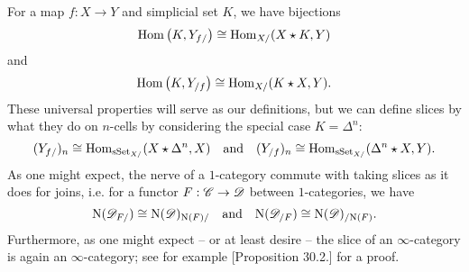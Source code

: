 \documentclass[../../thesis.tex]{subfiles}
\begin{document}
For a map $f:X\to Y$ and simplicial set $K$, we have bijections
\[
    \mathrm{Hom}\left(K, Y_{f /}\right) \cong \mathrm{Hom}_{X /}(X \star K, Y)
\]
and
\[
    \mathrm{Hom}\left(K, Y_{/ f}\right) \cong \mathrm{Hom}_{X /}(K \star X, Y).
\]
These universal properties will serve as our definitions, but we can define slices by what they do on $n$-cells by considering the special case $K=\Delta^n$:
\[
    (Y_{f/})_n \cong \mathrm{Hom}_{\mathrm{sSet}_{X/}}(X\star \Delta^n, X) \quad \text{and} \quad    (Y_{/f})_n \cong \mathrm{Hom}_{\mathrm{sSet}_{X/}}(\Delta^n\star X, Y).
\]
As one might expect, the nerve of a $1$-category commute with taking slices as it does for joins, i.e. for a functor $F: \mathscr{C} \to \mathscr{D}$ between $1$-categories, we have
\[
    \mathrm{N}(\mathscr{D}_{F/}) \cong \mathrm{N}(\mathscr{D})_{\mathrm{N}(F)/}\quad \text{and} \quad \mathrm{N}(\mathscr{D}_{/F}) \cong \mathrm{N}(\mathscr{D})_{/\mathrm{N}(F)}.
\]
Furthermore, as one might expect -- or at least desire -- the slice of an $\infty$-category is again an $\infty$-category; see for example \cite{Rezk}[Proposition 30.2.] for a proof.
\end{document}
